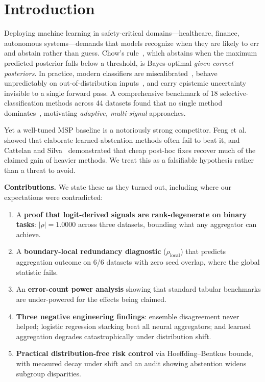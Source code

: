 \documentclass[conference]{IEEEtran}
\begin{document}
\section{Introduction}
\label{sec:intro}

Deploying machine learning in safety-critical domains---healthcare, finance, autonomous systems---demands that models recognize when they are likely to err and abstain rather than guess. Chow's rule~\cite{chow1970}, which abstains when the maximum predicted posterior falls below a threshold, is Bayes-optimal \emph{given correct posteriors}. In practice, modern classifiers are miscalibrated~\cite{guo2017calibration}, behave unpredictably on out-of-distribution inputs~\cite{liu2020energy}, and carry epistemic uncertainty invisible to a single forward pass. A comprehensive benchmark of 18 selective-classification methods across 44 datasets found that no single method dominates~\cite{pugnana2024benchmark}, motivating \emph{adaptive, multi-signal} approaches.

Yet a well-tuned MSP baseline is a notoriously strong competitor. Feng et al.~\cite{feng2023better} showed that elaborate learned-abstention methods often fail to beat it, and Cattelan and Silva~\cite{cattelan2023logitnorm} demonstrated that cheap post-hoc fixes recover much of the claimed gain of heavier methods. We treat this as a falsifiable hypothesis rather than a threat to avoid.

\textbf{Contributions.} We state these as they turned out, including where our expectations were contradicted:
\begin{enumerate}
  \item A \textbf{proof that logit-derived signals are rank-degenerate on binary tasks}: $|\rho| = 1.0000$ across three datasets, bounding what any aggregator can achieve.
  \item A \textbf{boundary-local redundancy diagnostic} ($\rho_{\mathrm{local}}$) that predicts aggregation outcome on 6/6 datasets with zero seed overlap, where the global statistic fails.
  \item An \textbf{error-count power analysis} showing that standard tabular benchmarks are under-powered for the effects being claimed.
  \item \textbf{Three negative engineering findings}: ensemble disagreement never helped; logistic regression stacking beat all neural aggregators; and learned aggregation degrades catastrophically under distribution shift.
  \item \textbf{Practical distribution-free risk control} via Hoeffding--Bentkus bounds, with measured decay under shift and an audit showing abstention widens subgroup disparities.
\end{enumerate}
\end{document}
